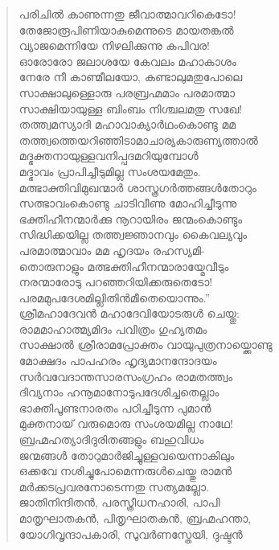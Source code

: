\begin{verse}
പരിചില്‍ കാണുന്നതു ജീവാത്മാവറികെടോ!\\
തേജോരൂപിണിയാകുമെന്നുടെ മായതങ്കല്‍\\
വ്യാജമെന്നിയേ നിഴലിക്കുന്നു കപിവര!\\
ഓരോരോ ജലാശയേ കേവലം മഹാകാശം\\
നേരേ നീ കാണ്മീലയോ, കണ്ടാലുമതുപോലെ\\
സാക്ഷാലുള്ളൊരു പരബ്രഹ്മമാം പരമാത്മാ\\
സാക്ഷിയായുള്ള ബിംബം നിശ്ചലമതു സഖേ!\\
തത്ത്വമസ്യാദി മഹാവാക്യാര്‍ഥംകൊണ്ടു മമ\\
തത്ത്വത്തെയറിഞ്ഞിടാമാചാര്യകാരുണ്യത്താല്‍\\
മദ്ഭക്തനായുള്ളവനിപ്പദമറിയുമ്പോള്‍\\
മദ്ഭാവം പ്രാപിച്ചീടുമില്ല സംശയമേതും.\\
മത്ഭാക്തിവിമുഖന്മാര്‍ ശാസ്ത്രഗര്‍ത്തങ്ങള്‍തോറും\\
സത്ഭാവംകൊണ്ടു ചാടിവീണു മോഹിച്ചീടുന്നു\\
ഭക്തിഹീനന്മാര്‍ക്കു നൂറായിരം ജന്മംകൊണ്ടും\\
സിദ്ധിക്കയില്ല തത്ത്വജ്ഞാനവും കൈവല്യവും\\
പരമാത്മാവാം മമ ഹൃദയം രഹസ്യമി-\\
തൊരുനാളും മത്ഭക്തിഹീനന്മാരായ്മേവീടും\\
നരന്മാരോടു പറഞ്ഞറിയിക്കരുതെടോ!\\
പരമമുപദേശമില്ലിതിന്‍മീതെയൊന്നും.”\\
ശ്രീമഹാദേവന്‍ മഹാദേവിയോടരുള്‍ ചെയ്തു:\\
രാമമാഹാത്മ്യമിദം പവിത്രം ഗുഹ്യതമം\\
സാക്ഷാല്‍ ശ്രീരാമപ്രോക്തം വായുപുത്രനായ്ക്കൊണ്ടു\\
മോക്ഷദം പാപഹരം ഹൃദ്യമാനന്ദോദയം\\
സര്‍വവേദാന്തസാരസംഗ്രഹം രാമതത്ത്വം\\
ദിവ്യനാം ഹനൂമാനോടുപദേശിച്ചതെല്ലാം\\
ഭാക്തിപൂണ്ടനാരതം പഠിച്ചീടുന്ന പുമാന്‍\\
മുക്തനായ് വരുമൊരു സംശയമില്ല നാഥേ!\\
ബ്രഹ്മഹത്യാദിദുരിതങ്ങളും ബഹുവിധം\\
ജന്മങ്ങള്‍ തോറുമാര്‍ജിച്ചുള്ളവയെന്നാകിലും\\
ഒക്കവേ നശിച്ചുപോമെന്നരുള്‍ചെയ്തു രാമന്‍\\
മര്‍ക്കടപ്രവരനോടെന്നതു സത്യമല്ലോ.\\
ജാതിനിന്ദിതന്‍, പരസ്ത്രീധനഹാരി, പാപി\\
മാതൃഘാതകന്‍, പിതൃഘാതകന്‍, ബ്രഹ്മഹന്താ,\\
യോഗിവൃന്ദാപകാരി, സുവര്‍ണസ്തേയി, ദുഷ്ടന്‍\\

\end{verse}

